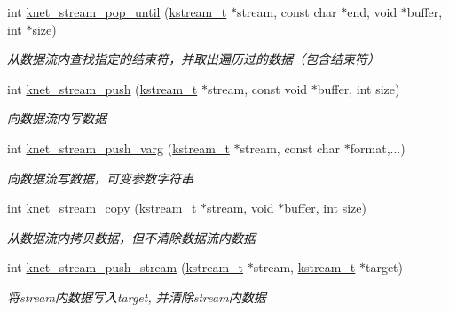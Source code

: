 \begin{DoxyCompactItemize}
int \hyperlink{a00137_gaf15f99fb1c4a55c2c9fcb9b01d0196f1_gaf15f99fb1c4a55c2c9fcb9b01d0196f1}{knet\+\_\+stream\+\_\+pop\+\_\+until} (\hyperlink{a00066_acc208c4c40c875eebbfef88f00fffacf_acc208c4c40c875eebbfef88f00fffacf}{kstream\+\_\+t} $\ast$stream, const char $\ast$end, void $\ast$buffer, int $\ast$size)
\begin{DoxyCompactList}\small\item\em 从数据流内查找指定的结束符，并取出遍历过的数据（包含结束符） \end{DoxyCompactList}\item 
int \hyperlink{a00137_gae342abfa7489dac8cd0676ae54763034_gae342abfa7489dac8cd0676ae54763034}{knet\+\_\+stream\+\_\+push} (\hyperlink{a00066_acc208c4c40c875eebbfef88f00fffacf_acc208c4c40c875eebbfef88f00fffacf}{kstream\+\_\+t} $\ast$stream, const void $\ast$buffer, int size)
\begin{DoxyCompactList}\small\item\em 向数据流内写数据 \end{DoxyCompactList}\item 
int \hyperlink{a00137_ga5385c5f448246089a80f0ca38de23e0d_ga5385c5f448246089a80f0ca38de23e0d}{knet\+\_\+stream\+\_\+push\+\_\+varg} (\hyperlink{a00066_acc208c4c40c875eebbfef88f00fffacf_acc208c4c40c875eebbfef88f00fffacf}{kstream\+\_\+t} $\ast$stream, const char $\ast$format,...)
\begin{DoxyCompactList}\small\item\em 向数据流写数据，可变参数字符串 \end{DoxyCompactList}\item 
int \hyperlink{a00137_ga6a338066a7df103ed2c7a46dc0a5b3c4_ga6a338066a7df103ed2c7a46dc0a5b3c4}{knet\+\_\+stream\+\_\+copy} (\hyperlink{a00066_acc208c4c40c875eebbfef88f00fffacf_acc208c4c40c875eebbfef88f00fffacf}{kstream\+\_\+t} $\ast$stream, void $\ast$buffer, int size)
\begin{DoxyCompactList}\small\item\em 从数据流内拷贝数据，但不清除数据流内数据 \end{DoxyCompactList}\item 
int \hyperlink{a00137_ga57debea3be18e64784e417edcc191673_ga57debea3be18e64784e417edcc191673}{knet\+\_\+stream\+\_\+push\+\_\+stream} (\hyperlink{a00066_acc208c4c40c875eebbfef88f00fffacf_acc208c4c40c875eebbfef88f00fffacf}{kstream\+\_\+t} $\ast$stream, \hyperlink{a00066_acc208c4c40c875eebbfef88f00fffacf_acc208c4c40c875eebbfef88f00fffacf}{kstream\+\_\+t} $\ast$target)
\begin{DoxyCompactList}\small\item\em 将stream内数据写入target, 并清除stream内数据 \end{DoxyCompactList}\item 

\end{DoxyCompactItemize}
